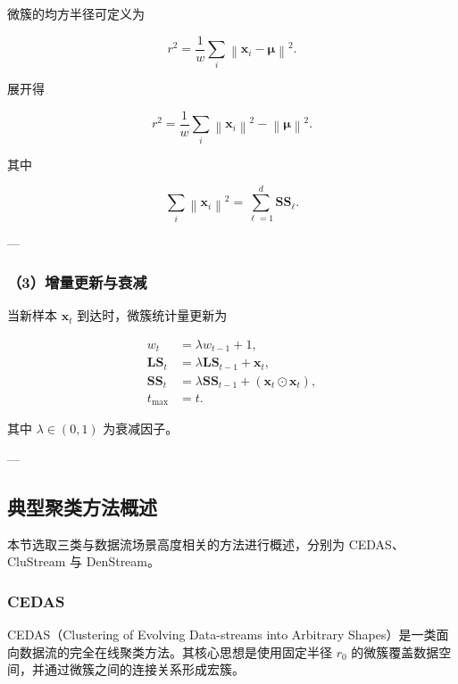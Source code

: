 \documentclass{xdupgthesis}
\begin{document}
微簇的均方半径可定义为

\begin{equation}
	r^2
	=
	\frac{1}{w}
	\sum_i
	\left\|
	\mathbf{x}_i-\boldsymbol{\mu}
	\right\|^2.
\end{equation}

展开得

\begin{equation}
	r^2
	=
	\frac{1}{w}
	\sum_i
	\left\|
	\mathbf{x}_i
	\right\|^2
	-
	\left\|
	\boldsymbol{\mu}
	\right\|^2.
\end{equation}

其中

\begin{equation}
	\sum_i
	\left\|
	\mathbf{x}_i
	\right\|^2
	=
	\sum_{\ell=1}^{d} \mathbf{SS}_\ell.
\end{equation}

---

\subsubsection{（3）增量更新与衰减}

当新样本 $\mathbf{x}_t$ 到达时，微簇统计量更新为

\begin{align}
	w_t &= \lambda w_{t-1}+1,\\
	\mathbf{LS}_t &= \lambda \mathbf{LS}_{t-1}+\mathbf{x}_t,\\
	\mathbf{SS}_t &= \lambda \mathbf{SS}_{t-1}+(\mathbf{x}_t\odot\mathbf{x}_t),\\
	t_{\max} &= t.
\end{align}

其中 $\lambda\in(0,1)$ 为衰减因子。

---

\subsection{典型聚类方法概述}

本节选取三类与数据流场景高度相关的方法进行概述，分别为 CEDAS、CluStream 与 DenStream。

\subsubsection{CEDAS}

CEDAS（Clustering of Evolving Data-streams into Arbitrary Shapes）是一类面向数据流的完全在线聚类方法。其核心思想是使用固定半径 $r_0$ 的微簇覆盖数据空间，并通过微簇之间的连接关系形成宏簇。
\end{document}
